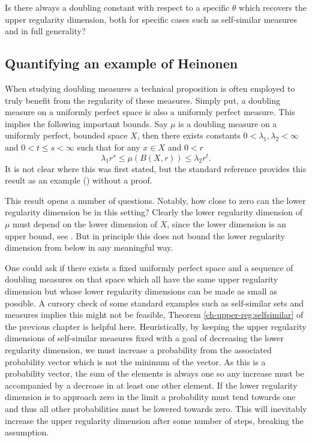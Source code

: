\begin{question}
Is there always a doubling constant with respect to a specific $\theta$ which recovers the upper regularity dimension, both for specific cases such as self-similar measures and in full generality?
\end{question}


\subsection{Quantifying an example of Heinonen}\label{ch-quantifying:sec:quantifying}


When studying doubling measures a technical proposition is often employed to truly benefit from the regularity of these measures. Simply put, a doubling measure on a uniformly perfect space is also a uniformly perfect measure. This implies the following important bounds. Say $\mu$ is a doubling measure on a uniformly perfect, bounded space $X$, then there exists constants $0< \lambda_1, \lambda_2 < \infty$ and $0 < t \le s < \infty$ such that for any $x \in X$ and $0 < r$
\[
\lambda_1 r^s \le \mu(B(X,r)) \le \lambda_2 r^t.
\]
It is not clear where this was first stated, but the standard reference \cite{heinonen} provides this result as an example (\cite[Exercise 13.1]{heinonen}) without a proof. 

This result opens a number of questions. Notably, how close to zero can the lower regularity dimension be in this setting? Clearly the lower regularity dimension of $\mu$ must depend on the lower dimension of $X$, since the lower dimension is an upper bound, see \cite{bylund}. But in principle this does not bound the lower regularity dimension from below in any meaningful way. 

One could ask if there exists a fixed uniformly perfect space and a sequence of doubling measures on that space which all have the same upper regularity dimension but whose lower regularity dimensions can be made as small as possible. A cursory check of some standard examples such as self-similar sets and measures implies this might not be feasible, Theorem \ref{ch-upper-reg:selfsimilar} of the previous chapter is helpful here. Heuristically, by keeping the upper regularity dimensions of self-similar measures fixed with a goal of decreasing the lower regularity dimension, we must increase a probability from the associated probability vector which is not the minimum of the vector. As this is a probability vector, the sum of the elements is always one so any increase must be accompanied by a decrease in at least one other element. If the lower regularity dimension is to approach zero in the limit a probability must tend towards one and thus all other probabilities must be lowered towards zero. This will inevitably increase the upper regularity dimension after some number of steps, breaking the assumption.

